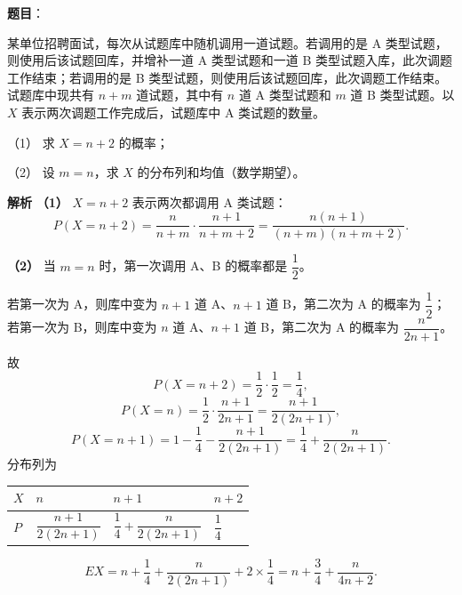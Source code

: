 \begin{answer}

\textbf{题目}：

某单位招聘面试，每次从试题库中随机调用一道试题。若调用的是 A 类型试题，则使用后该试题回库，并增补一道 A 类型试题和一道 B 类型试题入库，此次调题工作结束；若调用的是 B 类型试题，则使用后该试题回库，此次调题工作结束。试题库中现共有 $n+m$ 道试题，其中有 $n$ 道 A 类型试题和 $m$ 道 B 类型试题。以 $X$ 表示两次调题工作完成后，试题库中 A 类试题的数量。

（1） 求 $X=n+2$ 的概率；

（2） 设 $m=n$，求 $X$ 的分布列和均值（数学期望）。

\textbf{解析}
\textbf{（1）} $X=n+2$ 表示两次都调用 A 类试题：
\nopagebreak[4]
\[P(X=n+2)=\frac n{n+m}\cdot\frac{n+1}{n+m+2}=\frac{n(n+1)}{(n+m)(n+m+2)}.\]

\textbf{（2）} 当 $m=n$ 时，第一次调用 A、B 的概率都是 $\dfrac12$。

若第一次为 A，则库中变为 $n+1$ 道 A、$n+1$ 道 B，第二次为 A 的概率为 $\dfrac12$；
若第一次为 B，则库中变为 $n$ 道 A、$n+1$ 道 B，第二次为 A 的概率为 $\dfrac{n}{2n+1}$。

故
\nopagebreak[4]
\[P(X=n+2)=\frac12\cdot\frac12=\frac14,\]
\nopagebreak[4]
\[P(X=n)=\frac12\cdot\frac{n+1}{2n+1}=\frac{n+1}{2(2n+1)},\]
\nopagebreak[4]
\[P(X=n+1)=1-\frac14-\frac{n+1}{2(2n+1)}=\frac14+\frac{n}{2(2n+1)}.\]
分布列为

\begin{center}
\begin{tabular}{llll}
\toprule
$X$ & $n$ & $n+1$ & $n+2$ \\
\midrule
$P$ & $\dfrac{n+1}{2(2n+1)}$ & $\dfrac14+\dfrac{n}{2(2n+1)}$ & $\dfrac14$ \\
\bottomrule
\end{tabular}
\end{center}

\nopagebreak[4]
\[EX=n+\frac14+\frac{n}{2(2n+1)}+2\times\frac14=n+\frac34+\frac{n}{4n+2}.\]



\end{answer}
